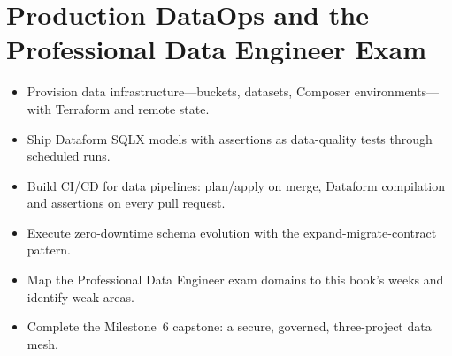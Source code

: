 \chapter{Production DataOps and the Professional Data Engineer Exam}

\begin{objectives}
\begin{itemize}
    \item Provision data infrastructure---buckets, datasets, Composer environments---with Terraform and remote state.
    \item Ship Dataform SQLX models with assertions as data-quality tests through scheduled runs.
    \item Build CI/CD for data pipelines: plan/apply on merge, Dataform compilation and assertions on every pull request.
    \item Execute zero-downtime schema evolution with the expand-migrate-contract pattern.
    \item Map the Professional Data Engineer exam domains to this book's weeks and identify weak areas.
    \item Complete the Milestone~6 capstone: a secure, governed, three-project data mesh.
\end{itemize}
\end{objectives}

